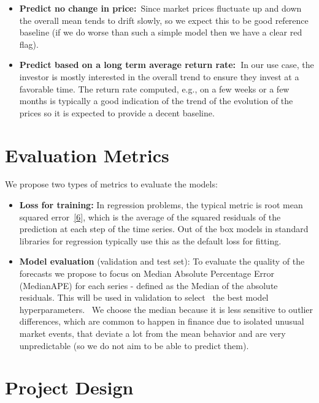 \documentclass[10pt]{article}
\providecommand{\tightlist}{\setlength{\itemsep}{0pt}\setlength{\parskip}{0pt}}%
\begin{document}
\begin{itemize}
\tightlist
\item
  \textbf{Predict no change in price:}~Since market prices fluctuate up
  and down the overall mean tends to drift slowly, so we expect this to
  be good reference baseline (if we do worse than such a simple model
  then we have a clear red flag).
\item
  \textbf{Predict based on a long term average return rate:~}In our use
  case, the investor is mostly interested in the overall trend to ensure
  they invest at a favorable time. The return rate computed, e.g., on a
  few weeks or a few months is typically a good indication of the trend
  of the evolution of the prices so it is expected to provide a decent
  baseline.~
\end{itemize}

\hypertarget{evaluation-metrics}{%
\section*{Evaluation Metrics}}

{\label{323921}}

We propose two types of metrics to evaluate the models:

\begin{itemize}
\tightlist
\item
  \textbf{Loss for training:} In regression problems, the typical metric
  is root mean squared error~\hyperref[csl:6]{[6]}, which is the average of
  the squared residuals of the prediction at each step of the time
  series. Out of the box models in standard libraries for regression
  typically use this as the default loss for fitting.
\item
  \textbf{Model evaluation} (validation and test set): To evaluate the
  quality of the forecasts we propose to focus on Median Absolute
  Percentage Error (MedianAPE) for each series - defined as the Median
  of the absolute residuals. This will be used in validation to select~
  the best model hyperparameters.~ We choose the median because it is
  less sensitive to outlier differences, which are common to happen in
  finance due to isolated unusual market events, that deviate a lot from
  the mean behavior and are very unpredictable (so we do not aim to be
  able to predict them).~
\end{itemize}

\hypertarget{project-design}{%
\section*{Project Design}}
\end{document}
